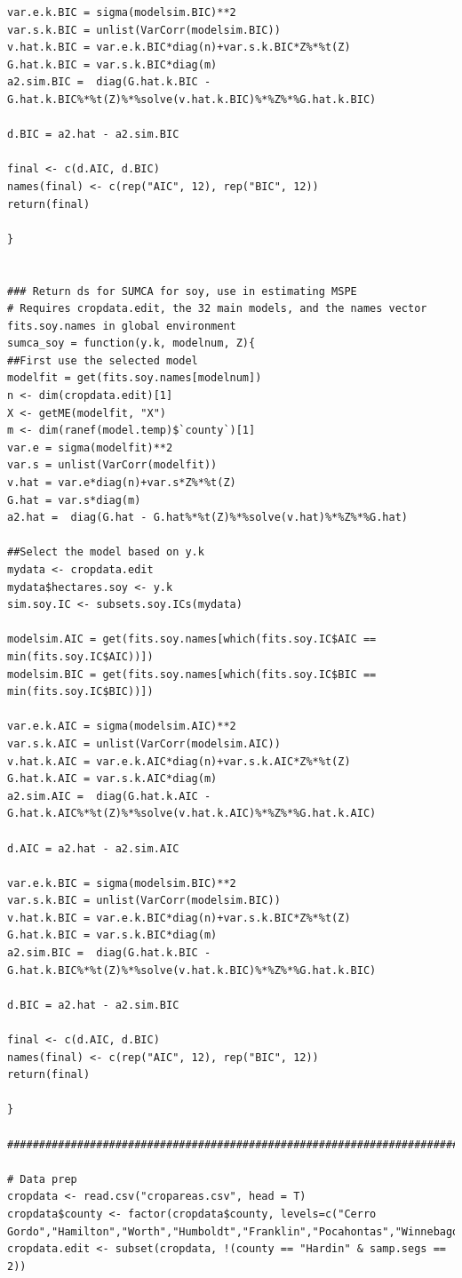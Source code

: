 \documentclass{article}
\begin{document}
\begin{Verbatim}[fontsize=\tiny]
var.e.k.BIC = sigma(modelsim.BIC)**2
var.s.k.BIC = unlist(VarCorr(modelsim.BIC))
v.hat.k.BIC = var.e.k.BIC*diag(n)+var.s.k.BIC*Z%*%t(Z)
G.hat.k.BIC = var.s.k.BIC*diag(m)
a2.sim.BIC =  diag(G.hat.k.BIC - G.hat.k.BIC%*%t(Z)%*%solve(v.hat.k.BIC)%*%Z%*%G.hat.k.BIC)

d.BIC = a2.hat - a2.sim.BIC

final <- c(d.AIC, d.BIC)
names(final) <- c(rep("AIC", 12), rep("BIC", 12))
return(final)

}


### Return ds for SUMCA for soy, use in estimating MSPE
# Requires cropdata.edit, the 32 main models, and the names vector fits.soy.names in global environment
sumca_soy = function(y.k, modelnum, Z){
##First use the selected model
modelfit = get(fits.soy.names[modelnum])
n <- dim(cropdata.edit)[1]
X <- getME(modelfit, "X")
m <- dim(ranef(model.temp)$`county`)[1]
var.e = sigma(modelfit)**2
var.s = unlist(VarCorr(modelfit))
v.hat = var.e*diag(n)+var.s*Z%*%t(Z)
G.hat = var.s*diag(m)
a2.hat =  diag(G.hat - G.hat%*%t(Z)%*%solve(v.hat)%*%Z%*%G.hat)

##Select the model based on y.k
mydata <- cropdata.edit
mydata$hectares.soy <- y.k
sim.soy.IC <- subsets.soy.ICs(mydata)

modelsim.AIC = get(fits.soy.names[which(fits.soy.IC$AIC == min(fits.soy.IC$AIC))])
modelsim.BIC = get(fits.soy.names[which(fits.soy.IC$BIC == min(fits.soy.IC$BIC))])

var.e.k.AIC = sigma(modelsim.AIC)**2
var.s.k.AIC = unlist(VarCorr(modelsim.AIC))
v.hat.k.AIC = var.e.k.AIC*diag(n)+var.s.k.AIC*Z%*%t(Z)
G.hat.k.AIC = var.s.k.AIC*diag(m)
a2.sim.AIC =  diag(G.hat.k.AIC - G.hat.k.AIC%*%t(Z)%*%solve(v.hat.k.AIC)%*%Z%*%G.hat.k.AIC)

d.AIC = a2.hat - a2.sim.AIC

var.e.k.BIC = sigma(modelsim.BIC)**2
var.s.k.BIC = unlist(VarCorr(modelsim.BIC))
v.hat.k.BIC = var.e.k.BIC*diag(n)+var.s.k.BIC*Z%*%t(Z)
G.hat.k.BIC = var.s.k.BIC*diag(m)
a2.sim.BIC =  diag(G.hat.k.BIC - G.hat.k.BIC%*%t(Z)%*%solve(v.hat.k.BIC)%*%Z%*%G.hat.k.BIC)

d.BIC = a2.hat - a2.sim.BIC

final <- c(d.AIC, d.BIC)
names(final) <- c(rep("AIC", 12), rep("BIC", 12))
return(final)

}

############################################################################

# Data prep
cropdata <- read.csv("cropareas.csv", head = T)
cropdata$county <- factor(cropdata$county, levels=c("Cerro Gordo","Hamilton","Worth","Humboldt","Franklin","Pocahontas","Winnebago","Wright","Webster","Hancock","Kossuth","Hardin"))
cropdata.edit <- subset(cropdata, !(county == "Hardin" & samp.segs == 2))


\end{Verbatim}
\end{document}

